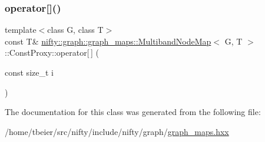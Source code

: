 \mbox{\label{classnifty_1_1graph_1_1graph__maps_1_1MultibandNodeMap_1_1ConstProxy_ae5d15b412656d2505a13a6f6209adee9}} 
\subsubsection{\texorpdfstring{operator[]()}{operator[]()}\hspace{0.1cm}{\footnotesize\ttfamily [2/2]}}
{\footnotesize\ttfamily template$<$class G, class T$>$ \\
const T\& \hyperlink{structnifty_1_1graph_1_1graph__maps_1_1MultibandNodeMap}{nifty\+::graph\+::graph\+\_\+maps\+::\+Multiband\+Node\+Map}$<$ G, T $>$\+::Const\+Proxy\+::operator\mbox{[}$\,$\mbox{]} (\begin{DoxyParamCaption}\item[{const size\+\_\+t}]{i }\end{DoxyParamCaption})\hspace{0.3cm}{\ttfamily [inline]}}



The documentation for this class was generated from the following file\+:\begin{DoxyCompactItemize}
\item 
/home/tbeier/src/nifty/include/nifty/graph/\hyperlink{graph__maps_8hxx}{graph\+\_\+maps.\+hxx}\end{DoxyCompactItemize}
